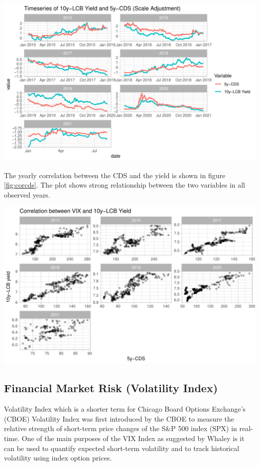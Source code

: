 \documentclass[11pt,a4paper,]{article}
\begin{document}
\includegraphics{Untitled_files/figure-latex/unnamed-chunk-13-1.pdf}

The yearly correlation between the CDS and the yield is shown in figure \ref{fig:corcds}. The plot shows strong relationship between the two variables in all observed years.

\includegraphics{Untitled_files/figure-latex/corcds-1.pdf}

\hypertarget{financial-market-risk-volatility-index}{%
\subsection{Financial Market Risk (Volatility Index)}\label{financial-market-risk-volatility-index}}

Volatility Index which is a shorter term for Chicago Board Options Exchange's (CBOE) Volatility Index was first introduced by the CBOE to measure the relative strength of short-term price changes of the S\&P 500 index (SPX) in real-time. One of the main purposes of the VIX Index as suggested by Whaley \autocite*{Whaley2009} is it can be used to quantify expected short-term volatility and to track historical volatility using index option prices.
\end{document}
